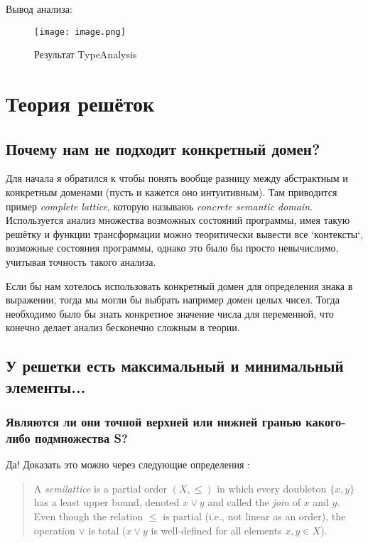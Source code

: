 \documentclass{report}
\begin{document}
Вывод анализа:
\begin{figure}
    \centering
    \texttt{[image: image.png]}
    \caption{Результат TypeAnalysis}
    \label{fig:enter-label}
\end{figure}

\chapter{Теория решёток}

\section{Почему нам не подходит конкретный домен?}
Для начала я обратился к \cite{Bydge06} чтобы понять вообще разницу между абстрактным и конкретным доменами (пусть и кажется оно интуитивным). Там приводится пример \textit{complete lattice}, которую называюь \textit{concrete semantic domain}. Используется анализ множества возможных состояний программы, имея такую решётку и функции трансформации можно теоритически вывести все `контексты`, возможные состояния программы, однако это было бы просто невычислимо, учитывая точность такого анализа.

Если бы нам хотелось использовать конкретный домен для определения знака в выражении, тогда мы могли бы выбрать например домен целых чисел. Тогда необходимо было бы знать конкретное значение числа для переменной, что конечно делает анализ бесконечно сложным в теории.

\section{У решетки есть максимальный и минимальный элементы...}

\subsection{Являются ли они точной верхней или нижней гранью какого-либо
подмножества S?}

Да! Доказать это можно через следующие определения \cite{StanCS353}:

\begin{quote}
A \textit{semilattice} is a partial order $(X, \leq)$ in which every doubleton $\{x, y\}$ has a least upper bound, denoted $x \vee y$ and called the \textit{join} of $x$ and $y$. Even though the relation $\leq$ is partial (i.e., not linear as an order), the operation $\vee$ is total ($x \vee y$ is well-defined for all elements $x, y \in X$).
\end{quote}
\end{document}
